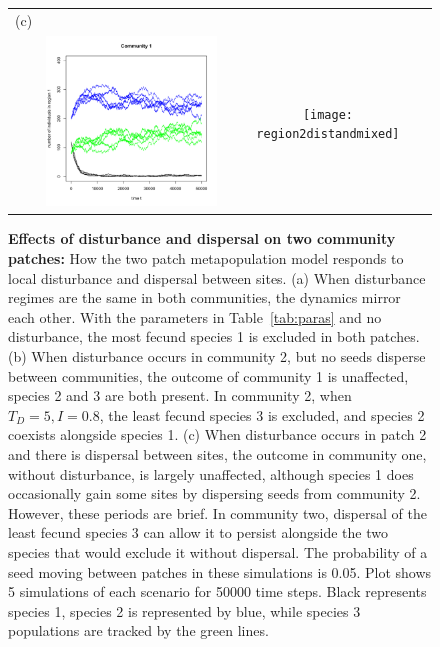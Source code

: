 \begin{figure}[htbp]
\begin{center}
\begin{tabular}{ccc}
(c)&&\\
&\includegraphics[width=2in]{region1distandmixed} &\texttt{[image: region2distandmixed]}
\end{tabular}
\caption[Effects of disturbance and dispersal on two community patches]{\textbf{Effects of disturbance and dispersal on two community patches:} How the two patch metapopulation model responds to local disturbance and dispersal between sites. (a) When disturbance regimes are the same in both communities, the dynamics mirror each other. With the parameters in Table~\ref{tab:paras} and no disturbance, the most fecund species 1 is excluded in both patches. (b) When disturbance occurs in community 2, but no seeds disperse between communities, the outcome of community 1 is unaffected, species 2 and 3 are both present. In community 2, when $T_D=5, I=0.8$, the least fecund species 3 is excluded, and species 2 coexists alongside species 1. (c) When disturbance occurs in patch 2 and there is dispersal between sites, the outcome in community one, without disturbance, is largely unaffected, although species 1 does occasionally gain some sites by dispersing seeds from community 2. However, these periods are brief. In community two, dispersal of the least fecund species 3 can allow it to persist alongside the two species that would exclude it without dispersal. The probability of a seed moving between patches in these simulations is 0.05. Plot shows 5 simulations of each scenario for 50000 time steps. Black represents species 1, species 2 is represented by blue, while species 3 populations are tracked by the green lines.}
\label{fig:regions}
\end{center}
\end{figure}

